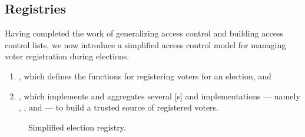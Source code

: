 \subsection{Registries}

Having completed the work of generalizing access control and building access
control lists, we now introduce a simplified access control model for managing
voter registration during elections.

\begin{enumerate}
  \item {}, which defines the functions for registering
    voters for an election, and
  \item {}, which implements and
    aggregates several [s] and  implementations
    --- namely , , and
     --- to build a trusted source of registered
    voters.
\end{enumerate}

\begin{figure}[H]
  \centering
  \caption{Simplified election registry.}\label{fig:registry}
\end{figure}




